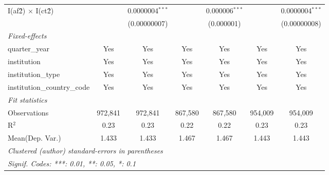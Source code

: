 \begin{tabular}{lcccccc}
   I(af\^2) $\times$ I(ct\^2)         &               & 0.0000004$^{***}$ &               & 0.000006$^{***}$ &               & 0.0000004$^{***}$\\   
                                      &               & (0.00000007)      &               & (0.000001)       &               & (0.00000008)\\   
   \midrule
   \emph{Fixed-effects}\\
   quarter\_year                      & Yes           & Yes               & Yes           & Yes              & Yes           & Yes\\  
   institution                        & Yes           & Yes               & Yes           & Yes              & Yes           & Yes\\  
   institution\_type                  & Yes           & Yes               & Yes           & Yes              & Yes           & Yes\\  
   institution\_country\_code         & Yes           & Yes               & Yes           & Yes              & Yes           & Yes\\  
   \midrule
   \emph{Fit statistics}\\
   Observations                       & 972,841       & 972,841           & 867,580       & 867,580          & 954,009       & 954,009\\  
   R$^2$                              & 0.23          & 0.23              & 0.22          & 0.22             & 0.23          & 0.23\\  
Mean(Dep. Var.) & 1.433 & 1.433 & 1.467 & 1.467 & 1.443 & 1.443 \\
   \midrule \midrule
   \multicolumn{7}{l}{\emph{Clustered (author) standard-errors in parentheses}}\\
   \multicolumn{7}{l}{\emph{Signif. Codes: ***: 0.01, **: 0.05, *: 0.1}}\\
\end{tabular}
\par\endgroup
